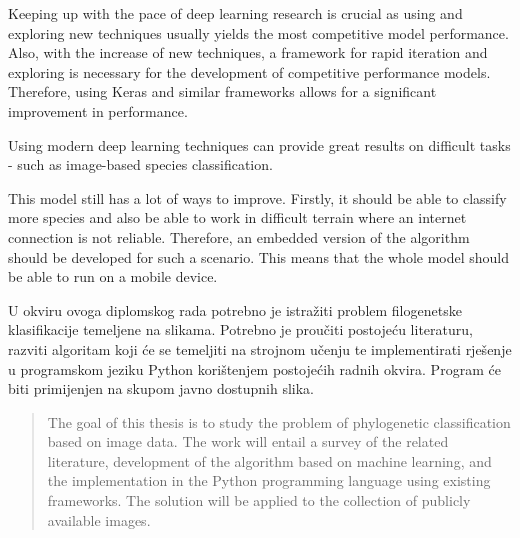 \documentclass[times, utf8, diplomski]{fer}
\begin{document}
Keeping up with the pace of deep learning research is crucial as using and exploring new techniques usually yields the most competitive model performance. Also, with the increase of new techniques, a framework for rapid iteration and exploring is necessary for the development of competitive performance models. Therefore, using Keras and similar frameworks allows for a significant improvement in performance.

Using modern deep learning techniques can provide great results on difficult tasks - such as image-based species classification.

This model still has a lot of ways to improve. Firstly, it should be able to classify more species and also be able to work in difficult terrain where an internet connection is not reliable. Therefore, an embedded version of the algorithm should be developed for such a scenario. This means that the whole model should be able to run on a mobile device.






\begin{sazetak}
U okviru ovoga diplomskog rada potrebno je istražiti problem filogenetske klasifikacije temeljene na slikama. Potrebno je proučiti postojeću literaturu, razviti algoritam koji će se temeljiti na strojnom učenju te implementirati rješenje u programskom jeziku Python korištenjem postojećih radnih okvira. Program će biti primijenjen na skupom javno dostupnih slika.
 

\end{sazetak}

\begin{abstract}
The goal of this thesis is to study the problem of phylogenetic classification based on image data. The work will entail a survey of the related literature, development of the algorithm based on machine learning, and the implementation in the Python programming language using existing frameworks. The solution will be applied to the collection of publicly available images.

\end{abstract}
\end{document}
